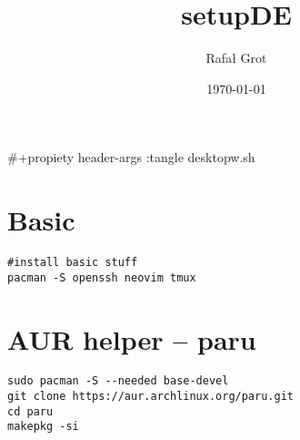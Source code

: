 \documentclass[11pt]{article}
\author{Rafał Grot}
\date{\today}
\title{setupDE}
\begin{document}
\maketitle
\tableofcontents

\#+propiety header-args :tangle desktopw.sh

\section{Basic}
\label{sec:org5ae7621}
\begin{verbatim}
#install basic stuff
pacman -S openssh neovim tmux
\end{verbatim}
\section{AUR helper -- paru}
\label{sec:org249006c}

\begin{verbatim}
sudo pacman -S --needed base-devel
git clone https://aur.archlinux.org/paru.git
cd paru
makepkg -si
\end{verbatim}
\end{document}
